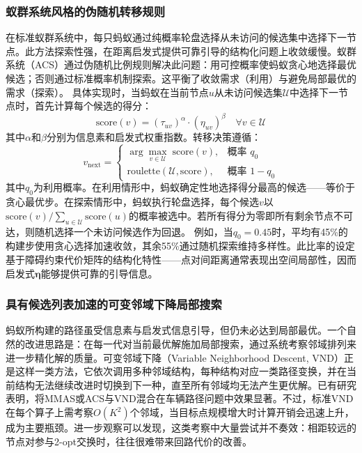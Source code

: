 \documentclass[lettersize,journal]{IEEEtran}
\begin{document}
\subsubsection{蚁群系统风格的伪随机转移规则}
在标准蚁群系统中，每只蚂蚁通过纯概率轮盘选择从未访问的候选集中选择下一节点。此方法探索性强，在距离启发式提供可靠引导的结构化问题上收敛缓慢。蚁群系统（ACS）\cite{ref22}通过伪随机比例规则解决此问题：用可控概率使蚂蚁贪心地选择最优候选；否则通过标准概率机制探索。这平衡了收敛需求（利用）与避免局部最优的需求（探索）。
具体实现时，当蚂蚁在当前节点$u$从未访问候选集$\mathcal{U}$中选择下一节点时，首先计算每个候选的得分：
\begin{equation}
\mathrm{score}(v) = (\tau_{uv})^{\alpha} \cdot (\eta_{uv})^{\beta} \quad \forall v \in \mathcal{U}
\label{eq:score}
\end{equation}
其中$\alpha$和$\beta$分别为信息素和启发式权重指数。转移决策遵循：
\begin{equation}
v_{\mathrm{next}} =
\begin{cases}
\arg\max_{v \in \mathcal{U}} \; \mathrm{score}(v), & \text{概率 } q_0 \\
\mathrm{roulette}(\mathcal{U}, \mathrm{score}), & \text{概率 } 1 - q_0
\end{cases}
\label{eq:trans}
\end{equation}
其中$q_0$为利用概率。在利用情形中，蚂蚁确定性地选择得分最高的候选——等价于贪心最优步。在探索情形中，蚂蚁执行轮盘选择，每个候选$v$以$\mathrm{score}(v) / \sum_{u \in \mathcal{U}} \mathrm{score}(u)$的概率被选中。若所有得分为零即所有剩余节点不可达，则随机选择一个未访问候选作为回退。
例如，当$q_0 = 0.45$时，平均有45\%的构建步使用贪心选择加速收敛，其余55\%通过随机探索维持多样性。此比率的设定基于障碍约束代价矩阵的结构化特性——点对间距离通常表现出空间局部性，因而启发式$\bm{\eta}$能够提供可靠的引导信息。
\subsubsection{具有候选列表加速的可变邻域下降局部搜索}
\label{subsec:vnd}
蚂蚁所构建的路径虽受信息素与启发式信息引导，但仍未必达到局部最优。一个自然的改进思路是：在每一代对当前最优解施加局部搜索，通过系统考察邻域排列来进一步精化解的质量。可变邻域下降（Variable Neighborhood Descent, VND）\cite{ref24}正是这样一类方法，它依次调用多种邻域结构，每种结构对应一类路径变换，并在当前结构无法继续改进时切换到下一种，直至所有邻域均无法产生更优解。已有研究表明，将MMAS或ACS与VND混合在车辆路径问题中效果显著\cite{ref25}。不过，标准VND在每个算子上需考察$O(K^2)$个邻域，当目标点规模增大时计算开销会迅速上升，成为主要瓶颈。进一步观察可以发现，这类考察中大量尝试并不奏效：相距较远的节点对参与2-opt交换时，往往很难带来回路代价的改善。
\end{document}
